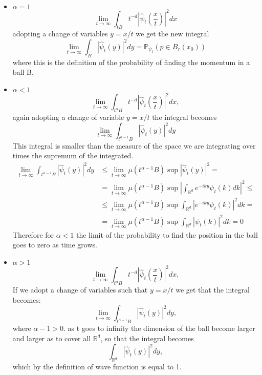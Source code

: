 \documentclass{article}
\begin{document}
\begin{itemize}[label = --]
    \item $\alpha = 1$
    \[
        \lim_{t \to \infty}\int_{tB} t^{-d} \left|\widehat\psi_t\left(\frac{x}{t}\right) \right|^2 dx 
    \]
    adopting a change of variables $y = x/t$ we get the new integral
    \[
        \lim_{t \to \infty} \int_{B} \left|\widehat\psi_t(y) \right|^2 dy = \mathbb P_{\psi_t}(p \in B_r(x_0))
    \]
    where this is the definition of the probability of finding the momentum in a ball B.
    \item $\alpha < 1$
    \[
        \lim_{t \to \infty} \int_{t^\alpha B} t^{-d} \left|\widehat\psi_t\left(\frac{x}{t}\right) \right|^2 dx,
    \]
    again adopting a change of variable $y = x/t$ the integral becomes
    \[
        \lim_{t \to \infty} \int_{t^{\alpha -1} B}  \left|\widehat\psi_t (y) \right|^2 dy
    \]
    This integral is smaller than the measure of the space we are integrating over times the supremum of the integrated.
    \[
        \begin{split}
            \lim_{t \to \infty} \int_{t^{\alpha -1} B}  \left|\widehat\psi_t (y) \right|^2 dy &\leq \lim_{t \to \infty} \mu(t^{\alpha -1}B)  \sup\left|\widehat\psi_t (y) \right|^2 =\\
            & =  \lim_{t \to \infty} \mu(t^{\alpha -1}B) \sup \left| \int_{\mathbb R^d} e^{-iky} \psi_t(k)dk \right|^2 \leq\\
            & \leq \lim_{t \to \infty} \mu(t^{\alpha -1}B) \sup \int_{\mathbb R^d} \left| e^{-iky} \psi_t(k) \right|^2 dk =\\
            &= \lim_{t \to \infty} \mu(t^{\alpha -1}B) \sup \int_{\mathbb R^d} \left| \psi_t(k) \right|^2 dk = 0
        \end{split}
    \]
    Therefore for $\alpha <1$ the limit of the probability to find the position in the ball goes to zero as time grows.
    \item $\alpha > 1$
    \[
        \lim_{t \to \infty} \int_{t^\alpha B} t^{-d} \left|\widehat\psi_t\left(\frac{x}{t}\right) \right|^2 dx,
    \]
    If we adopt a change of variables such that $y = x/t$ we get that the integral becomes:
    \[
        \lim_{t \to \infty} \int_{t^{\alpha-1} B} \left|\widehat\psi_t (y) \right|^2 dy,
    \]
    where $\alpha -1>0$. as t goes to infinity the dimension of the ball become larger and larger as to cover all $\mathbb R^d$, so that the integral becomes
    \[
       \int_{\mathbb R^d} \left|\widehat\psi_t (y) \right|^2 dy,
    \]
    which by the definition of wave function is equal to 1.
\end{itemize}
\end{document}
